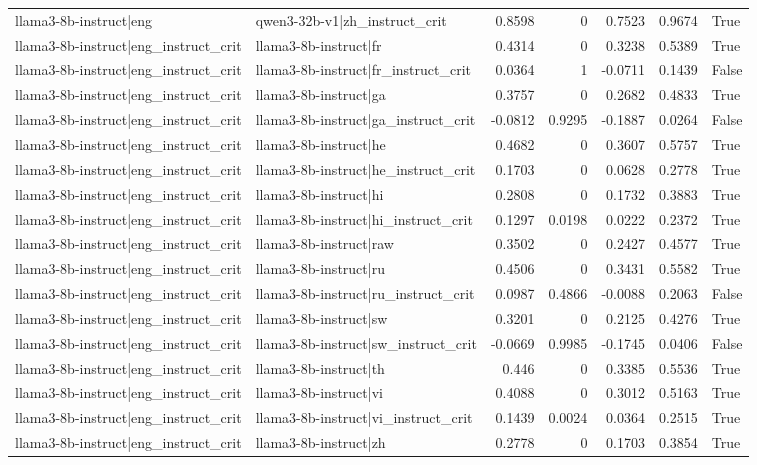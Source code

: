 \begin{table}
\begin{tabular}{l l r r r r l}
llama3-8b-instruct|eng & qwen3-32b-v1|zh_instruct_crit & 0.8598 & 0 & 0.7523 & 0.9674 & True \\
llama3-8b-instruct|eng_instruct_crit & llama3-8b-instruct|fr & 0.4314 & 0 & 0.3238 & 0.5389 & True \\
llama3-8b-instruct|eng_instruct_crit & llama3-8b-instruct|fr_instruct_crit & 0.0364 & 1 & -0.0711 & 0.1439 & False \\
llama3-8b-instruct|eng_instruct_crit & llama3-8b-instruct|ga & 0.3757 & 0 & 0.2682 & 0.4833 & True \\
llama3-8b-instruct|eng_instruct_crit & llama3-8b-instruct|ga_instruct_crit & -0.0812 & 0.9295 & -0.1887 & 0.0264 & False \\
llama3-8b-instruct|eng_instruct_crit & llama3-8b-instruct|he & 0.4682 & 0 & 0.3607 & 0.5757 & True \\
llama3-8b-instruct|eng_instruct_crit & llama3-8b-instruct|he_instruct_crit & 0.1703 & 0 & 0.0628 & 0.2778 & True \\
llama3-8b-instruct|eng_instruct_crit & llama3-8b-instruct|hi & 0.2808 & 0 & 0.1732 & 0.3883 & True \\
llama3-8b-instruct|eng_instruct_crit & llama3-8b-instruct|hi_instruct_crit & 0.1297 & 0.0198 & 0.0222 & 0.2372 & True \\
llama3-8b-instruct|eng_instruct_crit & llama3-8b-instruct|raw & 0.3502 & 0 & 0.2427 & 0.4577 & True \\
llama3-8b-instruct|eng_instruct_crit & llama3-8b-instruct|ru & 0.4506 & 0 & 0.3431 & 0.5582 & True \\
llama3-8b-instruct|eng_instruct_crit & llama3-8b-instruct|ru_instruct_crit & 0.0987 & 0.4866 & -0.0088 & 0.2063 & False \\
llama3-8b-instruct|eng_instruct_crit & llama3-8b-instruct|sw & 0.3201 & 0 & 0.2125 & 0.4276 & True \\
llama3-8b-instruct|eng_instruct_crit & llama3-8b-instruct|sw_instruct_crit & -0.0669 & 0.9985 & -0.1745 & 0.0406 & False \\
llama3-8b-instruct|eng_instruct_crit & llama3-8b-instruct|th & 0.446 & 0 & 0.3385 & 0.5536 & True \\
llama3-8b-instruct|eng_instruct_crit & llama3-8b-instruct|vi & 0.4088 & 0 & 0.3012 & 0.5163 & True \\
llama3-8b-instruct|eng_instruct_crit & llama3-8b-instruct|vi_instruct_crit & 0.1439 & 0.0024 & 0.0364 & 0.2515 & True \\
llama3-8b-instruct|eng_instruct_crit & llama3-8b-instruct|zh & 0.2778 & 0 & 0.1703 & 0.3854 & True \\

\end{tabular}
\end{table}
